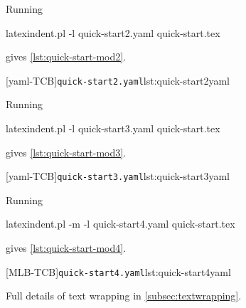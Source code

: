  \begin{example}
 Running

 \begin{commandshell}
latexindent.pl -l quick-start2.yaml quick-start.tex
\end{commandshell}

 gives \cref{lst:quick-start-mod2}.

 \begin{cmhtcbraster}
  [yaml-TCB]{\texttt{quick-start2.yaml}}{lst:quick-start2yaml}
 \end{cmhtcbraster}
 \end{example}

 \begin{example}
 Running

 \begin{commandshell}
latexindent.pl -l quick-start3.yaml quick-start.tex
\end{commandshell}

 gives \cref{lst:quick-start-mod3}.

 \begin{cmhtcbraster}
  [yaml-TCB]{\texttt{quick-start3.yaml}}{lst:quick-start3yaml}
 \end{cmhtcbraster}
 \end{example}

 \begin{example}
 Running

 \begin{commandshell}
latexindent.pl -m -l quick-start4.yaml quick-start.tex
\end{commandshell}

 gives \cref{lst:quick-start-mod4}.

 \begin{cmhtcbraster}
  [MLB-TCB]{\texttt{quick-start4.yaml}}{lst:quick-start4yaml}
 \end{cmhtcbraster}
 Full details of text wrapping in \cref{subsec:textwrapping}.
 \end{example}

